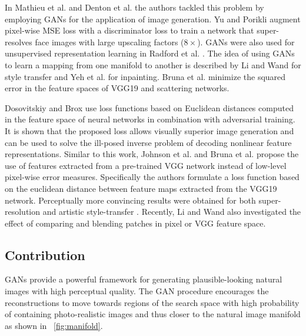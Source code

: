 \documentclass[10pt,twocolumn,letterpaper]{article}
\begin{document}
In Mathieu et al. \cite{Mathieu2015} and Denton et al. \cite{Denton2015} the authors tackled this problem by employing \acp{GAN} \cite{Goodfellow14GAN} for the application of image generation. Yu and Porikli \cite{yu2016ultra} augment pixel-wise \ac{MSE} loss with a discriminator loss to train a network that super-resolves face images with large upscaling factors ($8\times$). \acp{GAN} were also used for unsupervised representation learning in Radford et al. \cite{Radford2015}.
The idea of using \acp{GAN} to learn a mapping from one manifold to another is described by Li and Wand \cite{Li2016} for style transfer and Yeh et al. \cite{Yeh2016} for inpainting.
Bruna et al. \cite{bruna2016super} minimize the squared error in the feature spaces of VGG19 \cite{simonyan2014very} and scattering networks.

Dosovitskiy and Brox \cite{dosovitskiy2016generating} use loss functions based on Euclidean distances computed in the feature space of neural networks in combination with adversarial training. It is shown that the proposed loss allows visually superior image generation and can be used to solve the ill-posed inverse problem of decoding nonlinear feature representations.
Similar to this work, Johnson et al. \cite{Johnson16PercepLoss} and Bruna et al. \cite{bruna2016super} propose the use of features extracted from a pre-trained VGG network instead of low-level pixel-wise error measures. Specifically the authors formulate a loss function based on the euclidean distance between feature maps extracted from the VGG19 \cite{simonyan2014very} network. Perceptually more convincing results were obtained for both super-resolution and artistic style-transfer \cite{Gatys2015nips,Gatys2016cvpr}. Recently, Li and Wand \cite{Li2016} also investigated the effect of comparing and blending patches in pixel or VGG feature space.

\subsection{Contribution}
\acp{GAN} provide a powerful framework for generating plausible-looking natural images with high perceptual quality.
The \ac{GAN} procedure encourages the reconstructions to move towards regions of the search space with high probability of containing photo-realistic images and thus closer to the natural image manifold as shown in \figurename~\ref{fig:manifold}.
\end{document}
